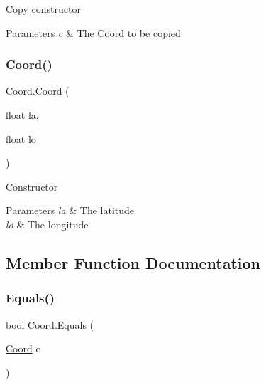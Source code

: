 Copy constructor 


\begin{DoxyParams}{Parameters}
{\em c} & The \hyperlink{structCoord}{Coord} to be copied\\
\hline
\end{DoxyParams}
\mbox{\label{structCoord_a810b3b1d700e2066973eb243b4ec474b}} 
\subsubsection{\texorpdfstring{Coord()}{Coord()}\hspace{0.1cm}{\footnotesize\ttfamily [2/2]}}
{\footnotesize\ttfamily Coord.\+Coord (\begin{DoxyParamCaption}\item[{float}]{la,  }\item[{float}]{lo }\end{DoxyParamCaption})\hspace{0.3cm}{\ttfamily [inline]}}



Constructor 


\begin{DoxyParams}{Parameters}
{\em la} & The latitude\\
\hline
{\em lo} & The longitude\\
\hline
\end{DoxyParams}


\subsection{Member Function Documentation}
\mbox{\label{structCoord_ab1c8eb195f1274c1869a13a835b927e2}} 
\subsubsection{\texorpdfstring{Equals()}{Equals()}}
{\footnotesize\ttfamily bool Coord.\+Equals (\begin{DoxyParamCaption}\item[{\hyperlink{structCoord}{Coord}}]{c }\end{DoxyParamCaption})\hspace{0.3cm}{\ttfamily [inline]}}



